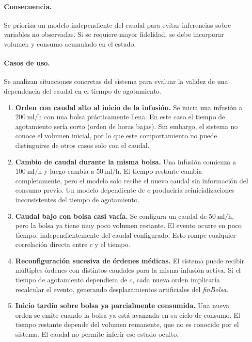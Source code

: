 \documentclass[11pt]{article}
\begin{document}
\paragraph{Consecuencia.}
Se prioriza un modelo independiente del caudal para evitar inferencias sobre variables no observadas. Si se requiere mayor fidelidad, se debe incorporar volumen y consumo acumulado en el estado.

\paragraph{Casos de uso.}
Se analizan situaciones concretas del sistema para evaluar la validez de una dependencia del caudal en el tiempo de agotamiento.

\begin{enumerate}
    \item \textbf{Orden con caudal alto al inicio de la infusión.}  
    Se inicia una infusión a $200\ \mathrm{ml/h}$ con una bolsa prácticamente llena. En este caso el tiempo de agotamiento sería corto (orden de horas bajas). Sin embargo, el sistema no conoce el volumen inicial, por lo que este comportamiento no puede distinguirse de otros casos solo con el caudal.

    \item \textbf{Cambio de caudal durante la misma bolsa.}  
    Una infusión comienza a $100\ \mathrm{ml/h}$ y luego cambia a $50\ \mathrm{ml/h}$. El tiempo restante cambia completamente, pero el modelo solo recibe el nuevo caudal sin información del consumo previo. Un modelo dependiente de $c$ produciría reinicializaciones inconsistentes del tiempo de agotamiento.

    \item \textbf{Caudal bajo con bolsa casi vacía.}  
    Se configura un caudal de $50\ \mathrm{ml/h}$, pero la bolsa ya tiene muy poco volumen restante. El evento ocurre en poco tiempo, independientemente del caudal configurado. Esto rompe cualquier correlación directa entre $c$ y el tiempo.

    \item \textbf{Reconfiguración sucesiva de órdenes médicas.}  
    El sistema puede recibir múltiples órdenes con distintos caudales para la misma infusión activa. Si el tiempo de agotamiento dependiera de $c$, cada nueva orden implicaría recalcular el evento, generando desplazamientos artificiales del \textit{finBolsa}.

    \item \textbf{Inicio tardío sobre bolsa ya parcialmente consumida.}  
    Una nueva orden se emite cuando la bolsa ya está avanzada en su ciclo de consumo. El tiempo restante depende del volumen remanente, que no es conocido por el sistema. El caudal no permite inferir ese estado oculto.
\end{enumerate}
\end{document}
